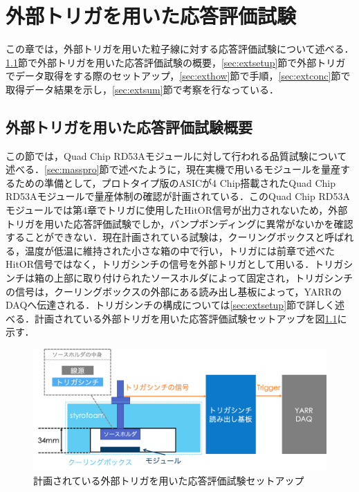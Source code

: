 \chapter{外部トリガを用いた応答評価試験}
この章では，外部トリガを用いた粒子線に対する応答評価試験について述べる．\ref{sec:extplan}節で外部トリガを用いた応答評価試験の概要，\ref{sec:extsetup}節で外部トリガでデータ取得をする際のセットアップ，\ref{sec:exthow}節で手順，\ref{sec:extconc}節で取得データ結果を示し，\ref{sec:extsum}節で考察を行なっている．

\section{外部トリガを用いた応答評価試験概要}
\label{sec:extplan}
この節では，Quad Chip RD53Aモジュールに対して行われる品質試験について述べる．\ref{sec:masspro}節で述べたように，現在実機で用いるモジュールを量産するための準備として，プロトタイプ版のASICが4 $\mathrm{Chip}$搭載されたQuad Chip RD53Aモジュールで量産体制の確認が計画されている．このQuad Chip RD53Aモジュールでは第4章でトリガに使用したHitOR信号が出力されないため，外部トリガを用いた応答評価試験でしか，バンプボンディングに異常がないかを確認することができない．現在計画されている試験は，クーリングボックスと呼ばれる，温度が低温に維持された小さな箱の中で行い，トリガには前章で述べたHitOR信号ではなく，トリガシンチの信号を外部トリガとして用いる．トリガシンチは箱の上部に取り付けられたソースホルダによって固定され，トリガシンチの信号は，クーリングボックスの外部にある読み出し基板によって，YARRのDAQへ伝達される．トリガシンチの構成については\ref{sec:extsetup}節で詳しく述べる．計画されている外部トリガを用いた応答評価試験セットアップを図\ref{fig:trigplan}に示す．

\begin{figure}[h]
  \centering
  \includegraphics[width=15cm]{./figure/trigplan.png}
  \caption{計画されている外部トリガを用いた応答評価試験セットアップ}
  \label{fig:trigplan}
\end{figure}

